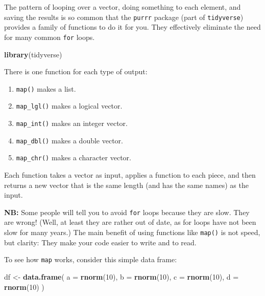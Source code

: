 \documentclass[
]{book}
\newenvironment{Shaded}{\begin{snugshade}}{\end{snugshade}}
\newcommand{\DataTypeTok}[1]{\textcolor[rgb]{0.13,0.29,0.53}{#1}}
\newcommand{\DecValTok}[1]{\textcolor[rgb]{0.00,0.00,0.81}{#1}}
\newcommand{\KeywordTok}[1]{\textcolor[rgb]{0.13,0.29,0.53}{\textbf{#1}}}
\newcommand{\NormalTok}[1]{#1}
\newcommand{\StringTok}[1]{\textcolor[rgb]{0.31,0.60,0.02}{#1}}
\providecommand{\tightlist}{%
  \setlength{\itemsep}{0pt}\setlength{\parskip}{0pt}}
\begin{document}
The pattern of looping over a vector, doing something to each element, and saving the results is so common that the \texttt{purrr} package (part of \texttt{tidyverse}) provides a family of functions to do it for you. They effectively eliminate the need for many common \texttt{for} loops.

\begin{Shaded}
\begin{Highlighting}[]
\KeywordTok{library}\NormalTok{(tidyverse)}
\end{Highlighting}
\end{Shaded}

There is one function for each type of output:

\begin{enumerate}
\def\labelenumi{\arabic{enumi}.}
\tightlist
\item
  \texttt{map()} makes a list.
\item
  \texttt{map\_lgl()} makes a logical vector.
\item
  \texttt{map\_int()} makes an integer vector.
\item
  \texttt{map\_dbl()} makes a double vector.
\item
  \texttt{map\_chr()} makes a character vector.
\end{enumerate}

Each function takes a vector as input, applies a function to each piece, and then returns a new vector that is the same length (and has the same names) as the input.

\textbf{NB:} Some people will tell you to avoid \texttt{for} loops because they are slow. They are wrong! (Well, at least they are rather out of date, as for loops have not been slow for many years.) The main benefit of using functions like \texttt{map()} is not speed, but clarity: They make your code easier to write and to read.

To see how \texttt{map} works, consider this simple data frame:

\begin{Shaded}
\begin{Highlighting}[]
\NormalTok{df <-}\StringTok{ }\KeywordTok{data.frame}\NormalTok{(}
  \DataTypeTok{a =} \KeywordTok{rnorm}\NormalTok{(}\DecValTok{10}\NormalTok{),}
  \DataTypeTok{b =} \KeywordTok{rnorm}\NormalTok{(}\DecValTok{10}\NormalTok{),}
  \DataTypeTok{c =} \KeywordTok{rnorm}\NormalTok{(}\DecValTok{10}\NormalTok{),}
  \DataTypeTok{d =} \KeywordTok{rnorm}\NormalTok{(}\DecValTok{10}\NormalTok{)}
\NormalTok{)}
\end{Highlighting}
\end{Shaded}
\end{document}
